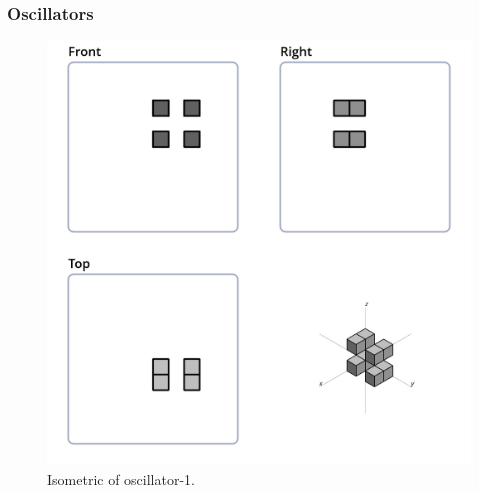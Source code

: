 \subsubsection{Oscillators}

\begin{figure}
	\centering
	\includegraphics[scale=0.4]{iso_settings/osc_1.png}
	\caption{Isometric of oscillator-1.}
  \label{fig:iso-osc-1}
\end{figure}

